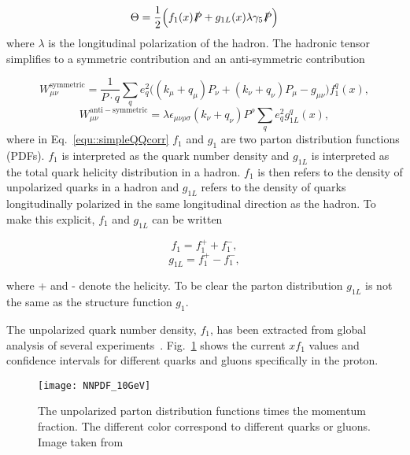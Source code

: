 \begin{equation}
  \label{equ::simpleQQcorr}
  \Theta = \frac{1}{2}
  \Big(
  f_1(x)\slashed{P} +
  g_{1L}(x)\lambda\gamma_5\slashed{P}
  \Big)
\end{equation}
\noindent
where $\lambda$ is the longitudinal polarization of the hadron.  The hadronic
tensor simplifies to a symmetric contribution and an anti-symmetric
contribution~\cite{Barone:2001sp}

\begin{equation}
  \label{equ::simpleHadronTensor}
  W^{\mathrm{symmetric}}_{\mu\nu} = \frac{1}{P\cdot q} \sum_q e_q^2
  \Big( (k_{\mu}+q_{\mu})P_{\nu} + (k_{\nu}+q_{\nu})P_{\mu}-g_{\mu\nu}
  \Big) f_1^q(x),
\end{equation}
\begin{equation}
  W^{\mathrm{anti-symmetric}}_{\mu\nu} =
  \lambda\epsilon_{\mu\nu\rho\sigma}(k_{\nu}+q_{\nu})P^{\rho}\sum_q e^2_q
  g^q_{1L}(x),
\end{equation}
\noindent
where in Eq.~\ref{equ::simpleQQcorr} $f_1$ and $g_1$ are two parton distribution
functions (PDFs).  $f_1$ is interpreted as the quark number density and $g_{1L}$
is interpreted as the total quark helicity distribution in a hadron.  $f_1$ is
then refers to the density of unpolarized quarks in a hadron and $g_{1L}$ refers
to the density of quarks longitudinally polarized in the same longitudinal
direction as the hadron.  To make this explicit, $f_1$ and $g_{1L}$ can be
written

\begin{multicols}{2}
  \noindent
  \begin{equation}
    f_1 = f_1^{+} + f_1^{-},
  \end{equation}
  \begin{equation}
    g_{1L} = f_1^{+} - f_1^{-},
  \end{equation}
\end{multicols}
\noindent
where + and - denote the helicity.  To be clear the parton distribution $g_{1L}$
is not the same as the structure function $g_1$.

The unpolarized quark number density, $f_1$, has been extracted from global
analysis of several experiments~\cite{Rojo_2015}.  Fig.~\ref{fig::NNPDF_10GeV}
shows the current $xf_1$ values and confidence intervals for different quarks
and gluons specifically in the proton.

\begin{figure}[h!t]
  \centering \texttt{[image: NNPDF\_10GeV]}
  \caption{The unpolarized parton distribution functions times the momentum
    fraction.  The different color correspond to different quarks or gluons.
    Image taken from~\cite{Tanabashi:2018oca}}
  \label{fig::NNPDF_10GeV}
\end{figure}

